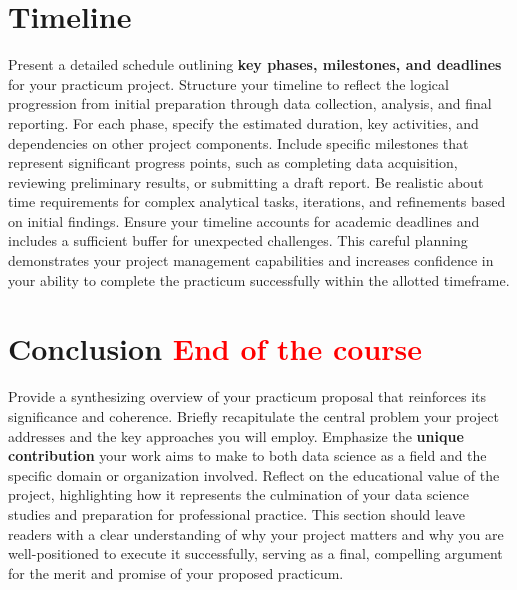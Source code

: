 \documentclass[12pt, onecolumn]{IEEEtran}
\begin{document}
\section{Timeline}
Present a detailed schedule outlining \textbf{key phases, milestones, and deadlines} for your practicum project. Structure your timeline to reflect the logical progression from initial preparation through data collection, analysis, and final reporting. For each phase, specify the estimated duration, key activities, and dependencies on other project components. Include specific milestones that represent significant progress points, such as completing data acquisition, reviewing preliminary results, or submitting a draft report. Be realistic about time requirements for complex analytical tasks, iterations, and refinements based on initial findings. Ensure your timeline accounts for academic deadlines and includes a sufficient buffer for unexpected challenges. This careful planning demonstrates your project management capabilities and increases confidence in your ability to complete the practicum successfully within the allotted timeframe.

\section{Conclusion \textcolor{red}{End of the course}}
Provide a synthesizing overview of your practicum proposal that reinforces its significance and coherence. Briefly recapitulate the central problem your project addresses and the key approaches you will employ. Emphasize the \textbf{unique contribution} your work aims to make to both data science as a field and the specific domain or organization involved. Reflect on the educational value of the project, highlighting how it represents the culmination of your data science studies and preparation for professional practice. This section should leave readers with a clear understanding of why your project matters and why you are well-positioned to execute it successfully, serving as a final, compelling argument for the merit and promise of your proposed practicum.


\vspace{0.5cm}
\end{document}
